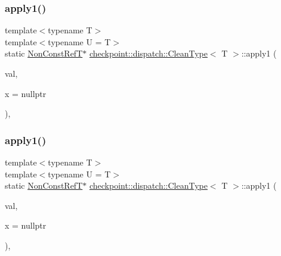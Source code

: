 \subsubsection{\texorpdfstring{apply1()}{apply1()}\hspace{0.1cm}{\footnotesize\ttfamily [1/2]}}
{\footnotesize\ttfamily template$<$typename T$>$ \\
template$<$typename U  = T$>$ \\
static \hyperlink{structcheckpoint_1_1dispatch_1_1_clean_type_a22ac8ae19000187cd7d3d218f3efa46e}{Non\+Const\+RefT}$\ast$ \hyperlink{structcheckpoint_1_1dispatch_1_1_clean_type}{checkpoint\+::dispatch\+::\+Clean\+Type}$<$ T $>$\+::apply1 (\begin{DoxyParamCaption}\item[{T $\ast$}]{val,  }\item[{\hyperlink{structcheckpoint_1_1dispatch_1_1_clean_type_a8edf98e1e2cbcd55b0b0a57d563be9e7}{is\+Const}$<$ U $>$ $\ast$}]{x = {\ttfamily nullptr} }\end{DoxyParamCaption})\hspace{0.3cm}{\ttfamily [inline]}, {\ttfamily [static]}}

\mbox{\label{structcheckpoint_1_1dispatch_1_1_clean_type_ac766696a734e2b65f223e91f11087962}} 
\subsubsection{\texorpdfstring{apply1()}{apply1()}\hspace{0.1cm}{\footnotesize\ttfamily [2/2]}}
{\footnotesize\ttfamily template$<$typename T$>$ \\
template$<$typename U  = T$>$ \\
static \hyperlink{structcheckpoint_1_1dispatch_1_1_clean_type_a22ac8ae19000187cd7d3d218f3efa46e}{Non\+Const\+RefT}$\ast$ \hyperlink{structcheckpoint_1_1dispatch_1_1_clean_type}{checkpoint\+::dispatch\+::\+Clean\+Type}$<$ T $>$\+::apply1 (\begin{DoxyParamCaption}\item[{T $\ast$}]{val,  }\item[{\hyperlink{structcheckpoint_1_1dispatch_1_1_clean_type_a87436675be4aca146c0ff68911684634}{is\+Not\+Const}$<$ U $>$ $\ast$}]{x = {\ttfamily nullptr} }\end{DoxyParamCaption})\hspace{0.3cm}{\ttfamily [inline]}, {\ttfamily [static]}}

